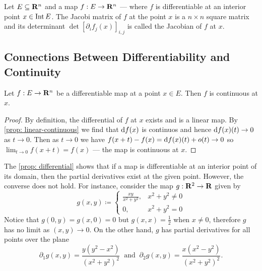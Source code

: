 \begin{definition}[Jacobian]\label{def: jacobian}
    Let \(E \subseteq \mathbf{R}^n\) and a map \(f: E \to \mathbf{R}^n\) --- where \(f\) is
    differentiable at an interior point \(x \in \operatorname{Int} E\). The Jacobi matrix of
    \(f\) at the point \(x\) is a \(n \times n\) square matrix and its determinant
    \(\det [\partial_i f_j(x)]_{i, j}\) is called the Jacobian of \(f\) at \(x\).
\end{definition}

\subsection{Connections Between Differentiability and Continuity}

\begin{corollary}
    Let \(f: E \to \mathbf{R}^n\) be a differentiable map at a point \(x \in E\).
    Then \(f\) is continuous at \(x\).
\end{corollary}

\begin{proof}
    By definition, the differential of \(f\) at \(x\) exists and is a linear map.
    By \cref{prop: linear-continuous} we find that \(\mathrm{d} f(x)\) is continuos and
    hence \(\mathrm{d} f(x)(t) \to 0\) as \(t \to 0\). Then as \(t \to 0\) we have
    \(f(x + t) - f(x) = \mathrm{d} f(x)(t) + o(t) \to 0\) so \(\lim_{t \to 0} f(x + t)
    = f(x)\) --- the map is continuous at \(x\).
\end{proof}

\begin{remark}
    The \cref{prop: differential} shows that if a map is differentiable at an
    interior point of its domain, then the partial derivatives exist at the given
    point. However, the converse does not hold. For instance, consider the map
    \(g: \mathbf{R}^2 \to \mathbf{R}\) given by
    \[
        g(x, y) \coloneq
        \begin{cases}
            \frac{x y}{x^2 + y^2}, & x^2 + y^2 \neq 0 \\
            0,                     & x^2 + y^2 = 0
        \end{cases}
    \]
    Notice that \(g(0, y) = g(x, 0) = 0\) but \(g(x, x) = \frac 1 2\) when \(x
    \neq 0\), therefore \(g\) has no limit as \((x,y) \to 0\). On the other hand,
    \(g\) has partial derivatives for all points over the plane
    \[
        \partial_1 g(x, y) = \frac{y (y^2 - x^2)}{(x^2 + y^2)^2}
        \ \text{ and }\
        \partial_2 g(x, y) = \frac{x (x^2 - y^2)}{(x^2 + y^2)^2}.
    \]
\end{remark}

